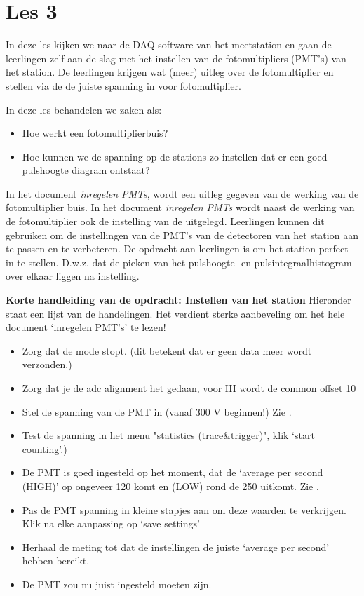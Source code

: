 \section{Les 3}

In deze les kijken we naar de DAQ software van het meetstation en gaan de leerlingen
zelf aan de slag met het instellen van de fotomultipliers (PMT's) van het station.
De leerlingen krijgen wat (meer) uitleg over de fotomultiplier en stellen via de \hisparc \daq
de juiste spanning in voor fotomultiplier.

In deze les behandelen we zaken als:
\begin{itemize}
    \item Hoe werkt een fotomultiplierbuis?
    \item Hoe kunnen we de spanning op de stations zo instellen dat er een
    goed pulshoogte diagram ontstaat?
\end{itemize}

In het document \textit{inregelen PMTs}, wordt een uitleg gegeven van de
werking van de fotomultiplier buis. In het document \textit{inregelen
PMTs} wordt naast de werking van de fotomultiplier ook de instelling van
de \hisparc \daq uitgelegd. Leerlingen kunnen dit gebruiken om de
instellingen van de PMT's van de detectoren van het \hisparc station aan
te passen en te verbeteren. De opdracht aan leerlingen is om het station perfect
in te stellen. D.w.z. dat de pieken van het pulshoogte- en pulsintegraalhistogram
over elkaar liggen na instelling.

\textbf{Korte handleiding van de opdracht: Instellen van het station} Hieronder staat een lijst van de handelingen.
Het verdient sterke aanbeveling om het hele document `inregelen PMT's' te lezen!

\begin{itemize}
    \item Zorg dat de \daq mode stopt. (dit betekent dat er geen data meer wordt verzonden.)
    \item Zorg dat je de adc alignment het gedaan, voor \hisparc III \daq wordt de common offset
    10
    \item Stel de spanning van de PMT in (vanaf 300 V beginnen!) Zie .
    \item Test de spanning in het menu "statistics (trace\&trigger)", klik `start counting'.)
    \item De PMT is goed ingesteld op het moment, dat de `average per second (HIGH)'
    op ongeveer 120 komt en (LOW) rond de 250 uitkomt. Zie .
    \item Pas de PMT spanning in kleine stapjes aan om deze waarden te verkrijgen. Klik na elke aanpassing op `save settings'
    \item Herhaal de meting tot dat de instellingen de juiste `average per second' hebben bereikt.
    \item De PMT zou nu juist ingesteld moeten zijn.
\end{itemize}


